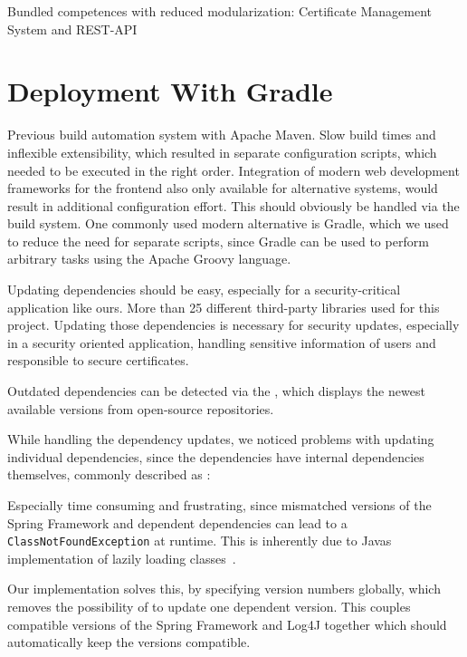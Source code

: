 Bundled competences with reduced modularization: Certificate Management System and REST-API

\section{Deployment With Gradle}\label{sec:deploymentWithGradle}

Previous build automation system with Apache Maven.
Slow build times and inflexible extensibility, which resulted in separate configuration scripts, which needed to be
executed in the right order.
Integration of modern web development frameworks for the frontend also only available for alternative systems, would
result in additional configuration effort.
This should obviously be handled via the build system.
One commonly used modern alternative is Gradle, which we used to reduce the need for separate scripts, since Gradle can
be used to perform arbitrary tasks using the Apache Groovy language.

Updating dependencies should be easy, especially for a security-critical application like ours.
More than 25 different third-party libraries used for this project.
Updating those dependencies is necessary for security updates, especially in a security oriented application, handling
sensitive information of users and responsible to secure certificates.

Outdated dependencies can be detected via the , which displays the newest available versions
from open-source repositories. %

While handling the dependency updates, we noticed problems with updating individual dependencies, since the dependencies
have internal dependencies themselves, commonly described as : %

Especially time consuming and frustrating, since mismatched versions of the Spring Framework and dependent dependencies
can lead to a \lstinline{ClassNotFoundException} at runtime.
This is inherently due to Javas implementation of lazily loading classes~\cite{gosling2014java}.

Our implementation solves this, by specifying version numbers globally, which removes the possibility of  to
update one dependent version.
This couples compatible versions of the Spring Framework and Log4J together which should automatically keep the versions
compatible.

